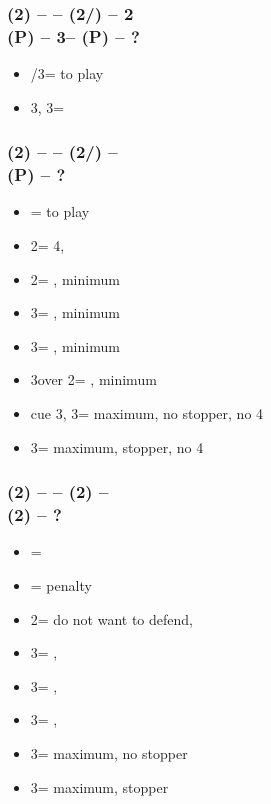 \documentclass[12pt, a4paper]{report}
\begin{document}
        \subsubsection*{(2\diams) -- \dbl -- (2\hearts/\spades) -- 2\nt \\
                        (P) -- 3\clubs -- (P) -- ?}        
        \begin{itemize}
            \item \pass/3\diams = to play
            \item 3\hearts, 3\spades = \inv
        \end{itemize}

        \subsubsection*{(2\diams) -- \dbl -- (2\hearts/\spades) -- \dbl \\
                        (P) -- ?}        
        \begin{itemize}
            \item \pass = to play
            \item 2\spades = 4\spades, \fonce
            \item 2\nt = \nat, minimum
            \item 3\clubs = \nat, minimum
            \item 3\diams = \nat, minimum
            \item 3\hearts over 2\spades = \nat, minimum
            \item cue 3\hearts, 3\spades = maximum, no stopper, no 4\spades
            \item 3\nt = maximum, stopper, no 4\spades
        \end{itemize}

        \subsubsection*{(2\diams) -- \dbl -- (2\hearts) -- \dbl \\
                        (2\spades) -- ?}        
        \begin{itemize}
            \item \pass = \fonce
            \item \dbl = penalty
            \item 2\nt = do not want to defend, \gf
            \item 3\clubs = \nat, \gf
            \item 3\diams = \nat, \gf
            \item 3\hearts = \nat, \gf
            \item 3\spades = maximum, no \spades stopper
            \item 3\nt = maximum, stopper
        \end{itemize}
\end{document}
